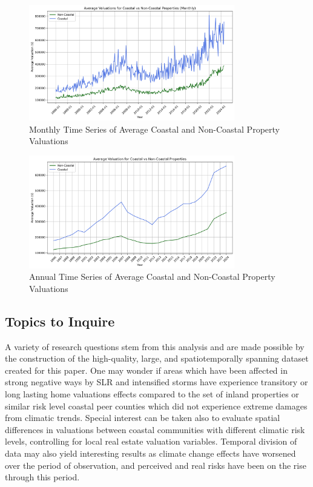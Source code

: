 \documentclass[12pt]{article}
\begin{document}
\begin{figure}[h]
    \centering
    \includegraphics[width=0.8\textwidth]{figures/coastal_vs_non_coastal_monthly.png}
    \caption{Monthly Time Series of Average Coastal and Non-Coastal Property Valuations}
    \label{fig:monthly_time_series_valuations}
\end{figure}

\begin{figure}[h]
    \centering
    \includegraphics[width=0.8\textwidth]{figures/annual_avg_chart.png}
    \caption{Annual Time Series of Average Coastal and Non-Coastal Property Valuations}
    \label{fig:annual_time_series_valuations}
\end{figure}

\subsection{Topics to Inquire}

A variety of research questions stem from this analysis and are made possible by the construction of the high-quality, large, and spatiotemporally spanning dataset created for this paper. One may wonder if areas which have been affected in strong negative ways by SLR and intensified storms have experience transitory or long lasting home valuations effects compared to the set of inland properties or similar risk level coastal peer counties which did not experience extreme damages from climatic trends. Special interest can be taken also to evaluate spatial differences in valuations between coastal communities with different climatic risk levels, controlling for local real estate valuation variables. Temporal division of data may also yield interesting results as climate change effects have worsened over the period of observation, and perceived and real risks have been on the rise through this period. 
\end{document}
